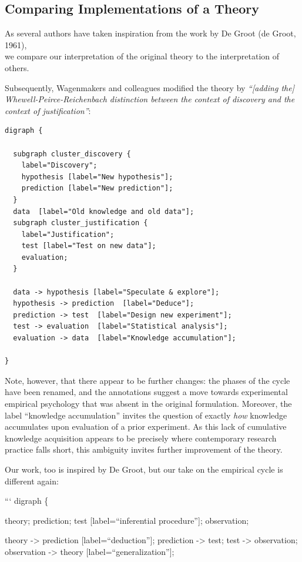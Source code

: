 \documentclass[
  man,floatsintext]{apa6}
\begin{document}
\subsection{Comparing Implementations of a Theory}\label{comparing-implementations-of-a-theory}

As several authors have taken inspiration from the work by De Groot (de Groot, 1961),\\
we compare our interpretation of the original theory to the interpretation of others.

Subsequently, Wagenmakers and colleagues modified the theory by \emph{``{[}adding the{]} Whewell-Peirce-Reichenbach distinction between the context of discovery and the context of justification''}:

\begin{verbatim}
digraph {

  subgraph cluster_discovery {
    label="Discovery";
    hypothesis [label="New hypothesis"];
    prediction [label="New prediction"];
  }
  data  [label="Old knowledge and old data"];      
  subgraph cluster_justification {
    label="Justification";
    test [label="Test on new data"];
    evaluation;
  }

  data -> hypothesis [label="Speculate & explore"];
  hypothesis -> prediction  [label="Deduce"];
  prediction -> test  [label="Design new experiment"];
  test -> evaluation  [label="Statistical analysis"];
  evaluation -> data  [label="Knowledge accumulation"];

}
\end{verbatim}

Note, however, that there appear to be further changes:
the phases of the cycle have been renamed,
and the annotations suggest a move towards experimental empirical psychology that was absent in the original formulation.
Moreover, the label ``knowledge accumulation'' invites the question of exactly \emph{how} knowledge accumulates upon evaluation of a prior experiment.
As this lack of cumulative knowledge acquisition appears to be precisely where contemporary research practice falls short, this ambiguity invites further improvement of the theory.

Our work, too is inspired by De Groot, but our take on the empirical cycle is different again:

```
digraph \{

theory;
prediction;
test {[}label=``inferential procedure''{]};
observation;

theory -\textgreater{} prediction {[}label=``deduction''{]};
prediction -\textgreater{} test;
test -\textgreater{} observation;
observation -\textgreater{} theory {[}label=``generalization''{]};
\end{document}
